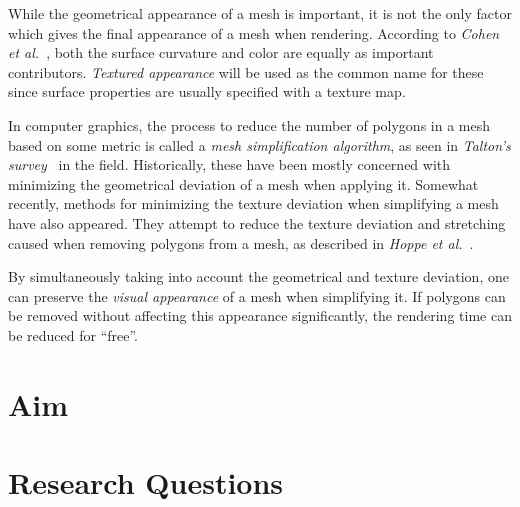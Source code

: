 While the geometrical appearance of a mesh is important, it is not the only factor which gives the final appearance of a mesh when rendering. According to \emph{Cohen et al.}~\cite{cohen1998appearance}, both the surface curvature and color are equally as important contributors. \emph{Textured appearance} will be used as the common name for these since surface properties are usually specified with a texture map.

In computer graphics, the process to reduce the number of polygons in a mesh based on some metric is called a \emph{mesh simplification algorithm}, as seen in \emph{Talton's survey}~\cite{talton2004short} in the field. Historically, these have been mostly concerned with minimizing the geometrical deviation of a mesh when applying it. Somewhat recently, methods for minimizing the texture deviation when simplifying a mesh have also appeared. They attempt to reduce the texture deviation and stretching caused when removing polygons from a mesh, as described in \emph{Hoppe et al.}~\cite{hoppe1996progressive}.

By simultaneously taking into account the geometrical and texture deviation, one can preserve the \emph{visual appearance} of a mesh when simplifying it. If polygons can be removed without affecting this appearance significantly, the rendering time can be reduced for ``free''.

\section{Aim}
\label{sec:aim}

\iffalse
To survey the field for state-of-the-art mesh simplification algorithms that preserve the visual appearance of a mesh, and integrate these into \emph{Configura's} (see Section~\ref{sec:background}) graphics pipeline. This will enable Configura to generate better \emph{Level of Detail} (LoD) meshes for speeding up their rendering time. Currently, Configura only takes into account the geometrical deviation when simplifying, with no regard for the textures (e.g. diffuse or normal) on top of the mesh.

Thereafter, we plan to evaluate each of these solutions by measuring their performance and ability to preserve the meshes' original appearance. In the end, the goal is to find the mesh simplification algorithm which both performs and preserves the mesh appearance well.
\fi

\section{Research Questions}
\label{sec:research-questions}

